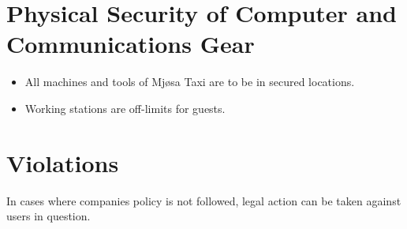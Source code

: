 \section{Physical Security of Computer and Communications Gear}

    \begin{itemize}[noitemsep]
        \item All machines and tools of Mjøsa Taxi are to be in secured locations.
        \item Working stations are off-limits for guests.

    \end{itemize}{}
    

\section{Violations}
In cases where companies policy is not followed, legal action can be taken against users in question.